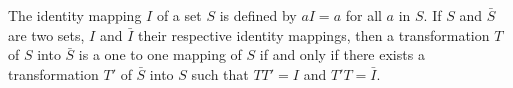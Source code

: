 The identity mapping $I$ of a set $S$ is defined by $aI = a$ for all $a$ in $S$. If $S$ and $\bar{S}$ are two sets, $I$ and $\bar{I}$ their respective identity mappings, then a transformation $T$ of $S$ into $\bar{S}$ is a one to one mapping of $S$ if and only if there exists a transformation $T'$ of $\bar{S}$ into $S$ such that $TT' = I$ and $T'T = \bar{I}$.
